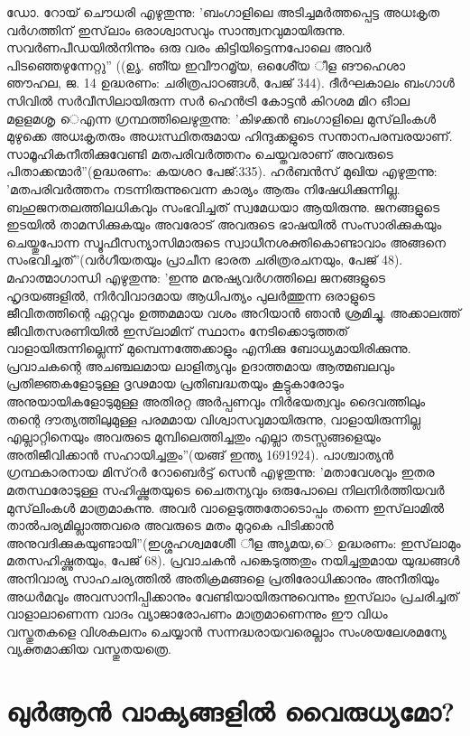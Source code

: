 ഡോ. റോയ് ചൌധരി എഴുതുന്നു: 'ബംഗാളിലെ അടിച്ചമര്‍ത്തപ്പെട്ട അധഃകൃത വര്‍ഗത്തിന് ഇസ്‌ലാം ഒരാശ്വാസവും സാന്ത്വനവുമായിരുന്നു. സവര്‍ണപീഡയില്‍നിന്നും ഒരു വരം കിട്ടിയിട്ടെന്നപോലെ അവര്‍ പിടഞ്ഞെഴുന്നേറ്റു'' ((ഉൃ. ഞീ്യ ഇവീൗറമൃ്യ, ഒശേെീ്യ ീള ങൗഹെശാ ഞൗഹല, ജ. 14 ഉദ്ധരണം: ചരിത്രപാഠങ്ങള്‍, പേജ് 344).
ദീര്‍ഘകാലം ബംഗാള്‍ സിവില്‍ സര്‍വീസിലായിരുന്ന സര്‍ ഹെന്‍ട്രി കോട്ടന്‍ കിറശമ മിറ ഒീാല മളളമശൃ െഎന്ന ഗ്രന്ഥത്തിലെഴുതുന്നു: 'കിഴക്കന്‍ ബംഗാളിലെ മുസ്‌ലിംകള്‍ മുഴുക്കെ അധഃകൃതരും അധഃസ്ഥിതരുമായ ഹിന്ദുക്കളുടെ സന്താനപരമ്പരയാണ്. സാമൂഹികനീതിക്കുവേണ്ടി മതപരിവര്‍ത്തനം ചെയ്തവരാണ് അവരുടെ പിതാക്കന്മാര്‍''(ഉദ്ധരണം: കയശറ പേജ്:335).
ഹര്‍ബന്‍സ് മുഖിയ എഴുതുന്നു: 'മതപരിവര്‍ത്തനം നടന്നിരുന്നുവെന്ന കാര്യം ആരും നിഷേധിക്കുന്നില്ല. ബഹുജനതലത്തിലധികവും സംഭവിച്ചത് സ്വമേധയാ ആയിരുന്നു. ജനങ്ങളുടെ ഇടയില്‍ താമസിക്കുകയും അവരോട് അവരുടെ ഭാഷയില്‍ സംസാരിക്കുകയും ചെയ്തുപോന്ന സ്വൂഫീസന്യാസിമാരുടെ സ്വാധീനശക്തികൊണ്ടാവാം അങ്ങനെ സംഭവിച്ചത്''(വര്‍ഗീയതയും പ്രാചീന ഭാരത ചരിത്രരചനയും, പേജ് 48).
മഹാത്മാഗാന്ധി എഴുതുന്നു: 'ഇന്നു മനുഷ്യവര്‍ഗത്തിലെ ജനങ്ങളുടെ ഹൃദയങ്ങളില്‍, നിര്‍വിവാദമായ ആധിപത്യം പുലര്‍ത്തുന്ന ഒരാളുടെ ജീവിതത്തിന്റെ ഏറ്റവും ഉത്തമമായ വശം അറിയാന്‍ ഞാന്‍ ശ്രമിച്ചു. അക്കാലത്ത് ജീവിതസരണിയില്‍ ഇസ്‌ലാമിന് സ്ഥാനം നേടിക്കൊടുത്തത് വാളായിരുന്നില്ലെന്ന് മുമ്പെന്നത്തേക്കാളും എനിക്കു ബോധ്യമായിരിക്കുന്നു. പ്രവാചകന്റെ അചഞ്ചലമായ ലാളിത്യവും ഉദാത്തമായ ആത്മബലവും പ്രതിജ്ഞകളോടുള്ള ദൃഢമായ പ്രതിബദ്ധതയും കൂട്ടുകാരോടും അനുയായികളോടുമുള്ള അതിരറ്റ അര്‍പ്പണവും നിര്‍ഭയത്വവും ദൈവത്തിലും തന്റെ ദൗത്യത്തിലുമുള്ള പരമമായ വിശ്വാസവുമായിരുന്നു, വാളായിരുന്നില്ല എല്ലാറ്റിനെയും അവരുടെ മുമ്പിലെത്തിച്ചതും എല്ലാ തടസ്സങ്ങളെയും അതിജീവിക്കാന്‍ സഹായിച്ചതും''(യങ്ങ് ഇന്ത്യ 1691924).
പാശ്ചാത്യന്‍ ഗ്രന്ഥകാരനായ മിസ്‌റര്‍ റോബെര്‍ട്ട് സെന്‍ എഴുതുന്നു: 'മതാവേശവും ഇതര മതസ്ഥരോടുള്ള സഹിഷ്ണുതയുടെ ചൈതന്യവും ഒരുപോലെ നിലനിര്‍ത്തിയവര്‍ മുസ്‌ലിംകള്‍ മാത്രമാകുന്നു. അവര്‍ വാളെടുത്തതോടൊപ്പം തന്നെ ഇസ്‌ലാമില്‍ താല്‍പര്യമില്ലാത്തവരെ അവരുടെ മതം മുറുകെ പിടിക്കാന്‍ അനുവദിക്കുകയുണ്ടായി''(ഇശ്ശഹശ്വമശേീി ീള അൃമയ,െ ഉദ്ധരണം: ഇസ്‌ലാമും മതസഹിഷ്ണുതയും, പേജ് 68).
പ്രവാചകന്‍ പങ്കെടുത്തതും നയിച്ചതുമായ യുദ്ധങ്ങള്‍ അനിവാര്യ സാഹചര്യത്തില്‍ അതിക്രമങ്ങളെ പ്രതിരോധിക്കാനും അനീതിയും അധര്‍മവും അവസാനിപ്പിക്കാനും വേണ്ടിയായിരുന്നുവെന്നും ഇസ്‌ലാം പ്രചരിച്ചത് വാളാലാണെന്ന വാദം വ്യാജാരോപണം മാത്രമാണെന്നും ഈ വിധം വസ്തുതകളെ വിശകലനം ചെയ്യാന്‍ സന്നദ്ധരായവരെല്ലാം സംശയലേശമന്യേ വ്യക്തമാക്കിയ വസ്തുതയത്രെ.

\chapter{ഖുര്‍ആന്‍ വാക്യങ്ങളില്‍ വൈരുധ്യമോ? }
